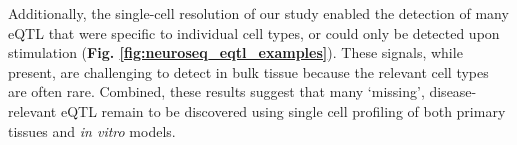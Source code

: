 Additionally, the single-cell resolution of our study enabled the detection of many eQTL that were specific to individual cell types, or could only be detected upon stimulation (\textbf{Fig. \ref{fig:neuroseq_eqtl_examples}}).
These signals, while present, are challenging to detect in bulk tissue because the relevant cell types are often rare. 
Combined, these results suggest that many `missing', disease-relevant eQTL remain to be discovered using single cell profiling of both primary tissues and \textit{in vitro} models.